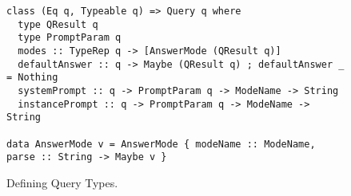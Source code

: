 \begin{figure}
\begin{ccodebox}
\begin{lstlisting}[style=haskell]
class (Eq q, Typeable q) => Query q where
  type QResult q
  type PromptParam q
  modes :: TypeRep q -> [AnswerMode (QResult q)]
  defaultAnswer :: q -> Maybe (QResult q) ; defaultAnswer _ = Nothing
  systemPrompt :: q -> PromptParam q -> ModeName -> String
  instancePrompt :: q -> PromptParam q -> ModeName -> String

data AnswerMode v = AnswerMode { modeName :: ModeName, parse :: String -> Maybe v }
\end{lstlisting}
\end{ccodebox}
\vspace{-0.3cm}
\caption{Defining Query Types.}\label{fig:query-typeclass}
\end{figure}
